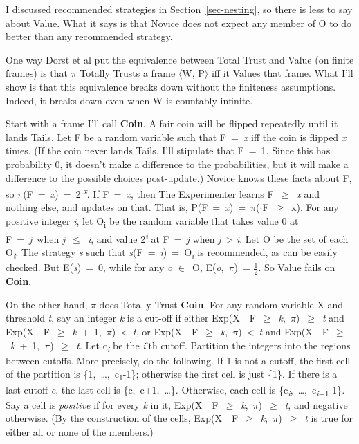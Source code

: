 \documentclass[
  12pt,
  letterpaper,
  DIV=11,
  numbers=noendperiod]{scrartcl}
\begin{document}
I discussed recommended strategies in Section~\ref{sec-nesting}, so
there is less to say about Value. What it says is that Novice does not
expect any member of O to do better than any recommended strategy.

One way Dorst et al put the equivalence between Total Trust and Value
(on finite frames) is that $\pi$ Totally Trusts a frame $\langle$W, P$\rangle$ iff it Values
that frame. What I'll show is that this equivalence breaks down without
the finiteness assumptions. Indeed, it breaks down even when W is
countably infinite.

Start with a frame I'll call \textbf{Coin}. A fair coin will be flipped
repeatedly until it lands Tails. Let F be a random variable such that
F~=~\emph{x} iff the coin is flipped \emph{x} times. (If the coin never
lands Tails, I'll stipulate that F~=~1. Since this has probability 0, it
doesn't make a difference to the probabilities, but it will make a
difference to the possible choices post-update.) Novice knows these
facts about F, so $\pi$(F~=~\emph{x})~=~2\textsuperscript{-\emph{x}}. If
F~=~\emph{x}, then The Experimenter learns F~$\geq$~\emph{x} and nothing
else, and updates on that. That is,
P(F~=~\emph{x})~=~$\pi$($\cdot$\textbar F~$\geq$~x). For any positive integer \emph{i},
let O\textsubscript{i} be the random variable that takes value 0 at
F~=~\emph{j}~when \emph{j}~$\leq$~\emph{i}, and value
2\textsuperscript{\emph{i}} at F~=~\emph{j} when \emph{j}~\textgreater{}
\emph{i}. Let O be the set of each O\textsubscript{\emph{i}}. The
strategy \emph{s} such that
\emph{s}(F~=~\emph{i})~=~O\textsubscript{\emph{i}} is recommended, as
can be easily checked. But E(\emph{s})~=~0, while for any \emph{o} $\in$~O,
E(\emph{o},~$\pi$)~= $\frac{1}{2}$. So Value fails on \textbf{Coin}.

On the other hand, $\pi$ does Totally Trust \textbf{Coin}. For any random
variable X and threshold \emph{t}, say an integer \emph{k} is a cut-off
if either Exp(X~\textbar~F~$\geq$~\emph{k},~$\pi$)~$\geq$~\emph{t} and
Exp(X~\textbar~F~$\geq$~\emph{k}~+~1,~$\pi$)~\textless~\emph{t}, or
Exp(X~\textbar~F~$\geq$~\emph{k},~$\pi$)~\textless~\emph{t} and
Exp(X~\textbar~F~$\geq$~\emph{k}~+~1,~$\pi$)~$\geq$~\emph{t}. Let
c\textsubscript{\emph{i}} be the \emph{i}'th cutoff. Partition the
integers into the regions between cutoffs. More precisely, do the
following. If 1 is not a cutoff, the first cell of the partition is
\{1,~\ldots,~c\textsubscript{1}-1\}; otherwise the first cell is just
\{1\}. If there is a last cutoff \emph{c}, the last cell is
\{c,~c+1,~\ldots\}. Otherwise, each cell is
\{c\textsubscript{\emph{i}},~\ldots,~c\textsubscript{\emph{i}+1}-1\}.
Say a cell is \emph{positive} if for every \emph{k} in it,
Exp(X~\textbar~F~$\geq$~\emph{k},~$\pi$)~$\geq$~\emph{t}, and negative otherwise. (By
the construction of the cells,
Exp(X~\textbar~F~$\geq$~\emph{k},~$\pi$)~$\geq$~\emph{t} is true for either all or
none of the members.)
\end{document}
